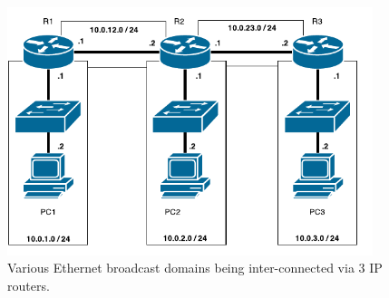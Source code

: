 \documentclass[pdftex,12pt,a4paper]{article}
\begin{document}
        \begin{figure}[tbh]
            \centering
            \includegraphics[width=0.95\textwidth]{figures/diag3.pdf}
            \caption{Various Ethernet broadcast domains being inter-connected
            via 3 IP routers.}
            \label{fig:ip}
        \end{figure}

        \newpage
\end{document}
